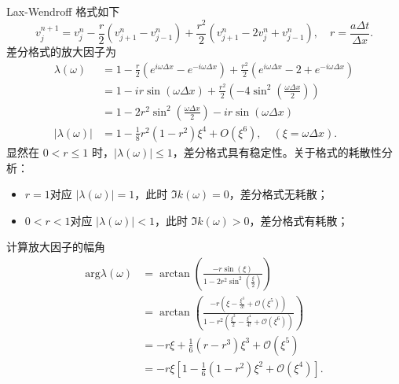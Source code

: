 \begin{solution*}
    Lax-Wendroff 格式如下
    \[
        v_{j}^{n+1}
        = v_j^n - \frac{r}2(v_{j+1}^n- v_{j-1}^n) + \frac{r^2}2
        (v_{j+1}^n-2v_{j}^n+v_{j-1}^n),
        \quad r = \frac{a \Delta t}{\Delta x}.
    \]
    差分格式的放大因子为
    \begin{align*}
        \lambda(\omega)
                          & = 1 - \frac{r}2(e^{i \omega \Delta x} - e^{- i \omega \Delta x})
        + \frac{r^2}2 (e^{i \omega \Delta x} - 2 + e^{- i \omega \Delta x})
        \\
                          & =
        1 - i r \sin(\omega \Delta x)+ \frac{r^2}2 (-4 \sin^2(\frac{\omega\Delta x}2))
        \\
                          & = 1 - 2r^2 \sin^2(\frac{\omega\Delta x}2)
        - i r \sin(\omega \Delta x)                                                          \\
        |\lambda(\omega)| & =
        1 - \frac18 r^2(1 - r^2) \xi^4 + O(\xi^6),\quad (\xi = \omega \Delta x).
    \end{align*}
    显然在 $ 0< r \le 1$ 时，$|\lambda(\omega)| \le 1$，差分格式具有稳定性。关于格式的耗散性分析：
    \begin{itemize}
        \item $r=1$对应 $|\lambda(\omega)| = 1$，此时 $\Im k(\omega) = 0$，差分格式无耗散；
        \item $0<r<1$对应 $|\lambda(\omega)| < 1$，此时 $\Im k(\omega) > 0$，差分格式有耗散；
    \end{itemize}
    计算放大因子的幅角
    \begin{align*}
        \text{arg} \lambda(\omega)
         & =
        \arctan \left(\frac{
                -r \sin(\xi)
            }{
                1 - 2r^2 \sin^2(\frac{\xi}2)
        }     \right)                                            \\
         & =
        \arctan \left(\frac{
                -r (\xi - \frac{\xi^3}{3!} + \mathcal{O}(\xi^5))
            }{
                1 - r^2 \left(
                \frac{\xi^2}2 - \frac{\xi^4}{4!} + \mathcal{O}(\xi^6)
                \right)
        }     \right)                                            \\
         & =
        - r \xi + \frac16 (r -  r^3) \xi^3 +  \mathcal{O}(\xi^5) \\
         & = - r\xi \left[
            1 - \frac16 (1-r^2) \xi^2 +  \mathcal{O}(\xi^4)
            \right].
    \end{align*}

\end{solution*}
